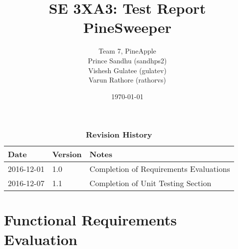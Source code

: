 \documentclass[12pt, titlepage]{article}
\title{SE 3XA3: Test Report\\PineSweeper}
\author{Team 7, PineApple
		\\ Prince Sandhu (sandhps2)
		\\ Vishesh Gulatee (gulatev)
		\\ Varun Rathore (rathorvs)
}
\date{\today}
\begin{document}
\maketitle
{}
\tableofcontents
\listoftables
\listoffigures
\begin{table}[!htbp]
\caption{\bf Revision History}
\begin{tabularx}{\textwidth}{p{3cm}p{2cm}X}
\toprule {\bf Date} & {\bf Version} & {\bf Notes}\\
\midrule
2016-12-01 & 1.0 & Completion of Requirements Evaluations\\
2016-12-07 & 1.1 & Completion of Unit Testing Section\\
\bottomrule
\end{tabularx}
\end{table}

\newpage
{}

\section{Functional Requirements Evaluation}
\end{document}
